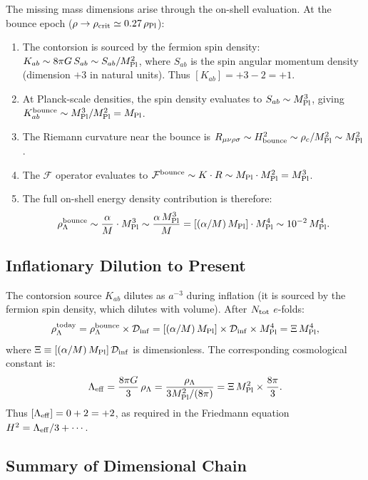 \documentclass[aps,prd,twocolumn,superscriptaddress,showpacs,preprintnumbers,nofootinbib,longbibliography,floatfix]{revtex4-2}
\newcommand{\Leff}{\Lambda_{\rm eff}}
\newcommand{\Dinf}{\mathcal{D}_{\rm inf}}
\newcommand{\rhocrit}{\rho_{\rm crit}}
\newcommand{\rhoPl}{\rho_{\rm Pl}}
\newcommand{\MPl}{M_{\rm Pl}}
\begin{document}
The missing mass dimensions arise through the on-shell evaluation. At the bounce epoch ($\rho \to \rhocrit \simeq 0.27\,\rhoPl$):
\begin{enumerate}[leftmargin=*]
\item The contorsion is sourced by the fermion spin density: $K_{ab} \sim 8\pi G\,S_{ab} \sim S_{ab}/\MPl^2$, where $S_{ab}$ is the spin angular momentum density (dimension $+3$ in natural units). Thus $[K_{ab}] = +3 - 2 = +1$. \checkmark
\item At Planck-scale densities, the spin density evaluates to $S_{ab} \sim \MPl^3$, giving $K_{ab}^{\rm bounce} \sim \MPl^3/\MPl^2 = \MPl$.
\item The Riemann curvature near the bounce is $R_{\mu\nu\rho\sigma} \sim H_{\rm bounce}^2 \sim \rho_c/\MPl^2 \sim \MPl^2$.
\item The $\mathcal{F}$ operator evaluates to $\mathcal{F}^{\rm bounce} \sim K \cdot R \sim \MPl \cdot \MPl^2 = \MPl^3$.
\item The full on-shell energy density contribution is therefore:
\begin{equation}
\rho_\Lambda^{\rm bounce} \sim \frac{\alpha}{M}\cdot\MPl^3 \sim \frac{\alpha\,\MPl^3}{M} = [(\alpha/M)\,\MPl]\cdot\MPl^4 \sim 10^{-2}\,\MPl^4.
\end{equation}
\end{enumerate}

\subsection{Inflationary Dilution to Present}

The contorsion source $K_{ab}$ dilutes as $a^{-3}$ during inflation (it is sourced by the fermion spin density, which dilutes with volume). After $N_{\rm tot}$ $e$-folds:
\begin{equation}
\rho_\Lambda^{\rm today} = \rho_\Lambda^{\rm bounce} \times \Dinf = [(\alpha/M)\,\MPl]\times\Dinf\times\MPl^4 = \Xi\,\MPl^4,
\end{equation}
where $\Xi \equiv [(\alpha/M)\,\MPl]\,\Dinf$ is dimensionless. The corresponding cosmological constant is:
\begin{equation}
\Leff = \frac{8\pi G}{3}\,\rho_\Lambda = \frac{\rho_\Lambda}{3\MPl^2/(8\pi)} = \Xi\,\MPl^2 \times \frac{8\pi}{3}.
\end{equation}
Thus $[\Leff] = 0 + 2 = +2$, as required in the Friedmann equation $H^2 = \Leff/3 + \cdots$. \checkmark

\subsection{Summary of Dimensional Chain}
\end{document}
